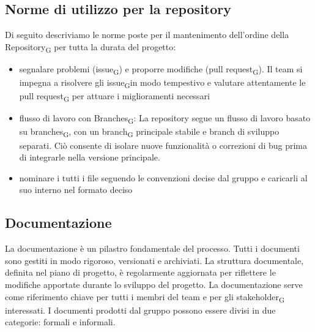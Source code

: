 \documentclass{article}
\begin{document}
\subsection{Norme di utilizzo per la repository}
Di seguito descriviamo le norme poste per il mantenimento dell'ordine della Repository\textsubscript{G} per tutta la durata del progetto:
\begin{itemize}
    \item segnalare problemi (issue\textsubscript{G}) e proporre modifiche (pull request\textsubscript{G}). Il team si impegna a risolvere gli issue\textsubscript{G}in modo tempestivo e valutare attentamente le pull request\textsubscript{G} per attuare i miglioramenti necessari
    \item flusso di lavoro con Branches\textsubscript{G}: La repository segue un flusso di lavoro basato su branches\textsubscript{G}, con un branch\textsubscript{G} principale stabile e branch di sviluppo separati. Ciò consente di isolare nuove funzionalità o correzioni di bug prima di integrarle nella versione principale.
    \item nominare i tutti i file seguendo le convenzioni decise dal gruppo e caricarli al suo interno nel formato deciso
\end{itemize}



\subsection{Documentazione}
La documentazione è un pilastro fondamentale del processo. Tutti i documenti sono gestiti in modo rigoroso, versionati e archiviati. La struttura documentale, definita nel piano di progetto, è regolarmente aggiornata per riflettere le modifiche apportate durante lo sviluppo del progetto. La documentazione serve come riferimento chiave per tutti i membri del team e per gli stakeholder\textsubscript{G} interessati. I documenti prodotti dal gruppo possono essere divisi in due categorie: formali e informali.
\end{document}
